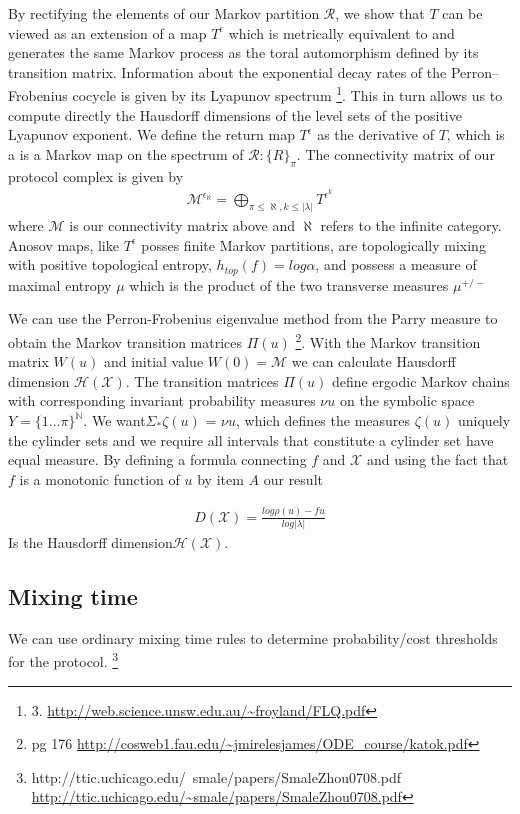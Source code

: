 \documentclass{article}
\begin{document}
By rectifying the elements of our Markov partition $\mathcal{R}$, we show that $T$ can be viewed as an extension of a map $T^{\epsilon}$ which is metrically equivalent to and generates the same Markov process as the toral automorphism defined by its transition matrix. Information about the exponential decay rates of the Perron–Frobenius cocycle is given by its Lyapunov spectrum \footnote{3. \url{http://web.science.unsw.edu.au/~froyland/FLQ.pdf}}. This in turn allows us to compute directly the Hausdorff dimensions of the level sets of the positive Lyapunov exponent. We define the return map $T^{\epsilon}$ as the derivative of $T$, which is a is a Markov map on the spectrum of $\mathcal{R}: \{R\}_\pi$. The connectivity matrix of our protocol complex is given by
\begin{equation} \label{eq1}
\begin{split}
\mathcal{M}^{\epsilon_\aleph} = \bigoplus_{\pi \leq \aleph, k\leq |\lambda|} T^{\epsilon^{k}}
\end{split}
\end{equation}
where $\mathcal{M}$ is our connectivity matrix above and $\aleph$ refers to the infinite category. Anosov maps, like $T^{\epsilon}$ posses finite Markov partitions, are topologically mixing with positive topological entropy, $h_{top}(f) = log \alpha$, and possess a measure of maximal entropy $\mu$ which is the product of the two transverse measures $\mu^{+/-}$

We can use the Perron-Frobenius eigenvalue method from the Parry measure to obtain the Markov transition matrices $\Pi(u)$ \footnote{ pg 176 \url{http://cosweb1.fau.edu/~jmirelesjames/ODE_course/katok.pdf}}. With the Markov transition matrix $W(u)$ and initial value $W(0) = \mathcal{M}$ we can calculate Hausdorff dimension $\mathcal{H}(\mathcal{X})$. The transition matrices $\Pi(u)$ define ergodic Markov chains with corresponding invariant probability measures $\nu u$ on the symbolic space $Y = \{1 \dots \pi \}^{\mathbb{N}}$. We want$\Sigma_* \zeta(u)$ =  $\nu u$, which defines
the measures $\zeta(u)$ uniquely the cylinder sets and we require all intervals that constitute a cylinder set have equal measure. By defining a formula connecting $f$ and $\mathcal{X}$ and using the fact that $f$ is a monotonic function of $u$ by item $A$ our result

\begin{equation} \label{eq1}
\begin{split}
D(\mathcal{X}) = \frac{log \rho(u) - fu}{log |\lambda|}
\end{split}
\end{equation}
Is the Hausdorff dimension$\mathcal{H}(\mathcal{X})$. 
\subsection{Mixing time}
We can use ordinary mixing time rules to determine probability/cost thresholds for the protocol. \footnote{http://ttic.uchicago.edu/~smale/papers/SmaleZhou0708.pdf \url{http://ttic.uchicago.edu/~smale/papers/SmaleZhou0708.pdf}} 



\end{document}
